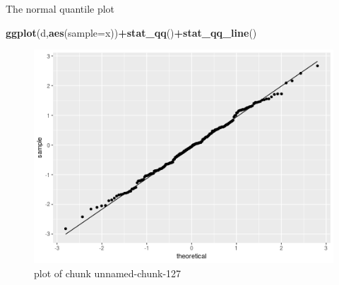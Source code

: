 \documentclass[ignorenonframetext,]{beamer}
\newenvironment{Shaded}{\begin{snugshade}}{\end{snugshade}}
\newcommand{\DataTypeTok}[1]{\textcolor[rgb]{0.13,0.29,0.53}{#1}}
\newcommand{\KeywordTok}[1]{\textcolor[rgb]{0.13,0.29,0.53}{\textbf{#1}}}
\newcommand{\NormalTok}[1]{#1}
\newcommand{\OperatorTok}[1]{\textcolor[rgb]{0.81,0.36,0.00}{\textbf{#1}}}
\begin{document}
\begin{frame}[fragile]{The normal quantile plot}
\protect\hypertarget{the-normal-quantile-plot-1}{}

\begin{Shaded}
\begin{Highlighting}[]
\KeywordTok{ggplot}\NormalTok{(d,}\KeywordTok{aes}\NormalTok{(}\DataTypeTok{sample=}\NormalTok{x))}\OperatorTok{+}\KeywordTok{stat_qq}\NormalTok{()}\OperatorTok{+}\KeywordTok{stat_qq_line}\NormalTok{()}
\end{Highlighting}
\end{Shaded}

\begin{figure}
\centering
\includegraphics{figure/unnamed-chunk-127-1.png}
\caption{plot of chunk unnamed-chunk-127}
\end{figure}

\end{frame}
\end{document}
